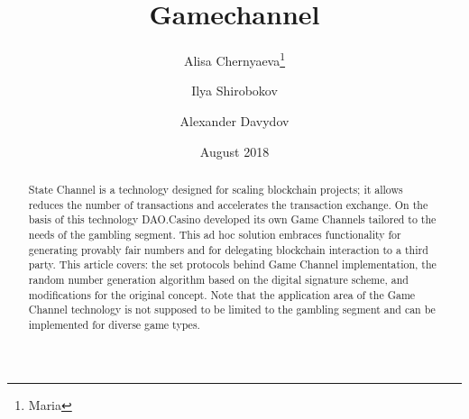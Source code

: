\documentclass[tikz, 12pt]{article}
\title {Gamechannel}
\author {Alisa Chernyaeva\thanks{Maria}}
\author{Ilya Shirobokov\samethanks}
\author{  Alexander Davydov\samethanks}
\affil{Research department, DAO.Casino Company}
\affil{ \href{mailto:Research@Dao.casino}{Research@Dao.casino}}
\date {August 2018}
\theoremstyle{definition}
\theoremstyle{remark}
\begin{document}
\maketitle
	\begin{abstract}
State Channel is a technology designed for scaling blockchain projects; it allows reduces the number of transactions and accelerates the transaction exchange. On the basis of this technology DAO.Casino developed its own Game Channels tailored to the needs of the gambling segment. This ad hoc solution embraces functionality for generating provably fair numbers and for delegating blockchain interaction to a third party. This article covers: the set protocols behind Game Channel implementation, the random number generation algorithm based on the digital signature scheme, and modifications for the original concept. Note that the application area of the Game Channel technology is not supposed to be limited to the gambling segment and can be implemented for diverse game types.

	\end{abstract}
\tableofcontents	
	
	
		
\end{document}
